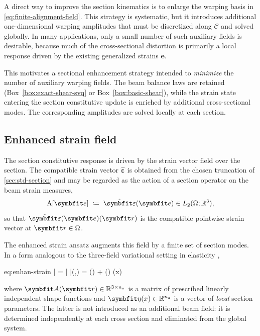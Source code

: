 A direct way to improve the section kinematics is to enlarge the warping basis in \eqref{eq:finite-alignment-field}. 
This strategy is systematic, but it introduces additional one-dimensional warping amplitudes that must be discretized along \(\mathcal{C}\) and solved globally. In many applications, only a small number of such auxiliary fields is desirable, because much of the cross-sectional distortion is primarily a local response driven by the existing generalized strains \(\bm{e}\).

This motivates a sectional enhancement strategy intended to \emph{minimize} the number of auxiliary warping fields. 
The beam balance laws are retained (Box~\ref{box:exact-shear-svq} or Box~\ref{box:basic-shear}), while the strain state entering the section constitutive update is enriched by additional cross-sectional modes. 
The corresponding amplitudes are solved locally at each section. 



\subsection{Enhanced strain field}

The section constitutive response is driven by the strain vector field over the section. The compatible strain vector $\hat{\bm{\varepsilon}}$ is obtained from the chosen truncation of \cref{sec:std-section} and may be regarded as the action of a section operator on the beam strain measures,
\[
\operatorname{A}[\bm{e}] \;\coloneq\; \hat{\bm{\varepsilon}}(\bm{e}) \in L_2(\Section;\mathbb{R}^3),
\]
so that $\hat{\StrainVector}(\bm{e})(\bm r)$ is the compatible pointwise strain vector at $\bm r\in\Section$.

The enhanced strain ansatz augments this field by a finite set of section modes. In a form analogous to the three-field variational setting in elasticity \citep{simo1986variational,simo1990class,simo1992geometrically},
\begin{SaveEquation}{eq:enhan-strain}
\bar{} = \bar{\bm{\varepsilon}}\symbun\FrameBasis
\qquad{}\qquad
\bar{\StrainVector}(,) =  \hat{\StrainVector}() + \EnhanShapes() \bm{\EnhanParam}(x)
\end{SaveEquation}
where $\EnhanShapes(\bm r)\in\mathbb{R}^{3\times \EnhanDim}$ is a matrix of prescribed linearly independent shape functions and $\bm{\EnhanParam}(x)\in\mathbb{R}^{\EnhanDim}$ is a vector of \emph{local} section parameters. 
The latter is not introduced as an additional beam field: it is determined independently at each cross section and eliminated from the global system. 


